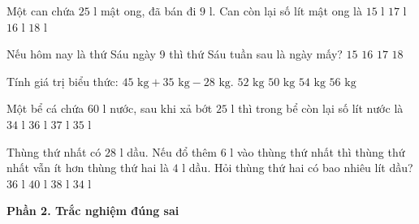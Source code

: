 \begin{ex} %
Một can chứa $25\text{ l}$ mật ong, đã bán đi $9\text{ l}$. Can còn lại số lít mật ong là
\choice
{$15\text{ l}$}
{$17\text{ l}$}
{\True $16\text{ l}$}
{$18\text{ l}$}
\end{ex}

\begin{ex} %
Nếu hôm nay là thứ Sáu ngày 9 thì thứ Sáu tuần sau là ngày mấy?
\choice
{$15$}
{\True $16$}
{$17$}
{$18$}
\end{ex}

\begin{ex} %
Tính giá trị biểu thức: $45\text{ kg} + 35\text{ kg} - 28\text{ kg}$.
\choice
{\True $52\text{ kg}$}
{$50\text{ kg}$}
{$54\text{ kg}$}
{$56\text{ kg}$}
\end{ex}

\begin{ex} %
Một bể cá chứa $60\text{ l}$ nước, sau khi xả bớt $25\text{ l}$ thì trong bể còn lại số lít nước là
\choice
{$34\text{ l}$}
{$36\text{ l}$}
{$37\text{ l}$}
{\True $35\text{ l}$}
\end{ex}

\begin{ex} %
Thùng thứ nhất có $28\text{ l}$ dầu. Nếu đổ thêm $6\text{ l}$ vào thùng thứ nhất thì thùng thứ nhất vẫn ít hơn thùng thứ hai là $4\text{ l}$ dầu. Hỏi thùng thứ hai có bao nhiêu lít dầu?
\choice
{$36\text{ l}$}
{$40\text{ l}$}
{\True $38\text{ l}$}
{$34\text{ l}$}
\end{ex}

\textbf{Phần 2. Trắc nghiệm đúng sai}

